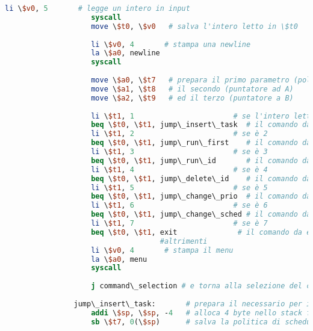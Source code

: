 \begin{center}
\begin{lstlisting}[language=mips, gobble=14, stepnumber=1]
                    li \$v0, 5       # legge un intero in input
                    syscall
                    move \$t0, \$v0   # salva l'intero letto in \$t0
                    
                    li \$v0, 4       # stampa una newline
                    la \$a0, newline
                    syscall
                    
                    move \$a0, \$t7   # prepara il primo parametro (politica di scheduling)
                    move \$a1, \$t8   # il secondo (puntatore ad A)
                    move \$a2, \$t9   # ed il terzo (puntatore a B)
                    
                    li \$t1, 1                       # se l'intero letto è 1
                    beq \$t0, \$t1, jump\_insert\_task  # il comando da eseguire è l'inserimento di un nuovo task
                    li \$t1, 2                       # se è 2
                    beq \$t0, \$t1, jump\_run\_first    # il comando da eseguire è l'esecuzione del primo task
                    li \$t1, 3                       # se è 3
                    beq \$t0, \$t1, jump\_run\_id       # il comando da eseguire è l'esecuzione di un task specifico
                    li \$t1, 4                       # se è 4
                    beq \$t0, \$t1, jump\_delete\_id    # il comando da eseguire è l'eminazione di un task specifico
                    li \$t1, 5                       # se è 5
                    beq \$t0, \$t1, jump\_change\_prio  # il comando da eseguire è la modifica della priorità di un task specifico
                    li \$t1, 6                       # se è 6
                    beq \$t0, \$t1, jump\_change\_sched # il comando da eseguire è il cambio della politica di scheduling
                    li \$t1, 7                       # se è 7
                    beq \$t0, \$t1, exit              # il comando da eseguire è la terminazione del programma
                                    #altrimenti
                    li \$v0, 4       # stampa il menu
                    la \$a0, menu
                    syscall
                    
                    j command\_selection # e torna alla selezione del comando
                    
                jump\_insert\_task:       # prepara il necessario per il salto al comando d'inserimento
                    addi \$sp, \$sp, -4   # alloca 4 byte nello stack frame
                    sb \$t7, 0(\$sp)      # salva la politica di scheduling nello stack
                    

\end{lstlisting}
\end{center}
